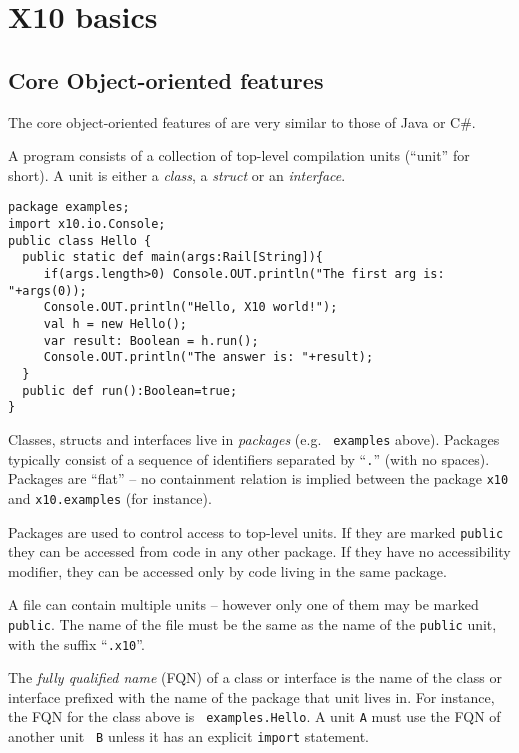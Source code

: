 \chapter{X10 basics}\label{chap:x10-basics}


\section{Core Object-oriented features}
The core object-oriented features of \Xten{} are very similar to those of Java or C\#.

A program consists of a collection of top-level compilation units
(``unit'' for short).  A unit is either a {\em class}, a {\em struct}
or an {\em interface}.  

{\footnotesize
\begin{verbatim}
package examples;
import x10.io.Console;
public class Hello {
  public static def main(args:Rail[String]){
     if(args.length>0) Console.OUT.println("The first arg is: "+args(0));
     Console.OUT.println("Hello, X10 world!");
     val h = new Hello(); 
     var result: Boolean = h.run(); 
     Console.OUT.println("The answer is: "+result);
  }
  public def run():Boolean=true; 
}  
\end{verbatim}}

Classes, structs and interfaces live in {\em packages} (e.g.{} {\tt
  examples} above). Packages typically consist of a sequence of
identifiers separated by ``{\tt .}'' (with no spaces). Packages are
``flat'' -- no containment relation is implied between the package
{\tt x10} and {\tt x10.examples} (for instance). 

Packages are used to control access to top-level units. If they are
marked {\tt public} they can be accessed from code in any other
package. If they have no accessibility modifier, they can be accessed
only by code living in the same package.

A file can contain multiple units -- however only one of them may be
marked {\tt public}. The name of the file must be the same as the name
of the {\tt public} unit, with the suffix ``{\tt .x10}''.


The {\em fully qualified name} (FQN) of a class or interface is the
name of the class or interface prefixed with the name of the package
that unit lives in. For instance, the FQN for the class above is {\tt
examples.Hello}. A unit {\tt A} must use the FQN of another unit {\tt
B} unless it has an explicit {\tt import} statement.

